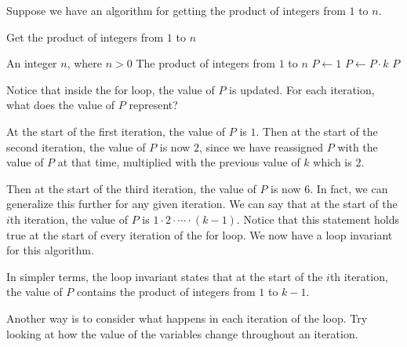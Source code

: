 \begin{example}
    Suppose we have an algorithm for getting the product of integers from $1$ to $n$.
    \begin{algorithm}[H]
        \caption{Get the product of integers from $1$ to $n$ }
        \begin{algorithmic}[1]
            \Require An integer $n$, where $n>0$ 
            \Ensure The product of integers from $1$ to $n$ 
            \State $P \gets 1$
            \State $P \gets P \cdot k$ 
            \EndFor
            \Return $P$
            \EndFunction
        \end{algorithmic}
    \end{algorithm}

    Notice that inside the for loop, the value of $P$ is updated. For each iteration, what does the value of $P$ represent? 

    At the start of the first iteration, the value of $P$ is $1$. Then at the start of the second iteration, the value of $P$ is now $2$, since we have reassigned $P$ with the value of $P$ at that time, multiplied with the previous value of $k$ which is $2$. 

    Then at the start of the third iteration, the value of $P$ is now $6$. In fact, we can generalize this further for any given iteration. We can say that at the start of the $i$th iteration, the value of $P$ is $1 \cdot 2 \cdot \cdots \cdot \left(k-1\right)$. Notice that this statement holds true at the start of every iteration of the for loop. We now have a loop invariant for this algorithm.

    In simpler terms, the loop invariant states that at the start of the $i$th iteration, the value of $P$ contains the product of integers from $1$ to $k-1$.
\end{example}

Another way is to consider what happens in each iteration of the loop. Try looking at how the value of the variables change throughout an iteration.

